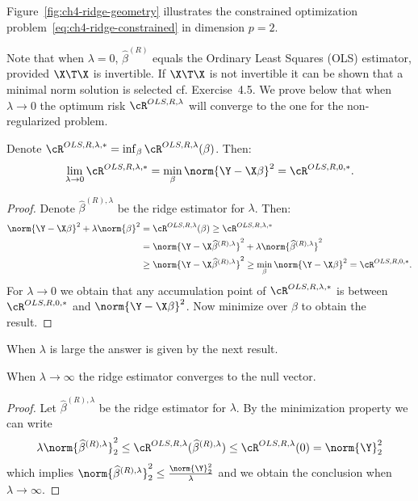 Figure~\ref{fig:ch4-ridge-geometry} illustrates the constrained optimization problem~\eqref{eq:ch4-ridge-constrained} in dimension $p = 2$.

Note that when $\lambda = 0$, $\widehat{\beta}^{(R)}$ equals the Ordinary Least Squares (OLS)
estimator, provided $\X\T \X$ is invertible. If $\X\T \X$ is not invertible it can be
shown that a minimal norm solution is selected cf. Exercise~4.5. We prove
below that when $\lambda \to 0$ the optimum risk $\cR^{OLS, R, \lambda}$ will converge to the one
for the non-regularized problem.

\begin{lemma}
Denote $\cR^{OLS, R, \lambda, *} = \inf_\beta \cR^{OLS, R, \lambda}(\beta)$. Then:
\begin{equation}\label{eq:ch4-ridge-limit-zero}
\lim_{\lambda \to 0} \cR^{OLS, R, \lambda, *} = \min_\beta \norm{\Y - \X \beta}^2 = \cR^{OLS, R, 0, *}.
\end{equation}
\end{lemma}

\begin{proof}
Denote $\widehat{\beta}^{(R), \lambda}$ be the ridge estimator for $\lambda$. Then:
\begin{align}
\norm{\Y - \X \beta}^2 + \lambda \norm{\beta}^2 &= \cR^{OLS, R, \lambda}(\beta) \ge \cR^{OLS, R, \lambda, *} \nonumber\\
&= \norm{\Y - \X \widehat{\beta}^{(R), \lambda}}^2 + \lambda \norm{\widehat{\beta}^{(R), \lambda}}^2 \nonumber\\
&\ge \norm{\Y - \X \widehat{\beta}^{(R), \lambda}}^2 \ge \min_\beta \norm{\Y - \X \beta}^2 = \cR^{OLS, R, 0, *}. \label{eq:ch4-ridge-chain}
\end{align}
For $\lambda \to 0$ we obtain that any accumulation point of $\cR^{OLS, R, \lambda, *}$ is between
$\cR^{OLS, R, 0, *}$ and $\norm{\Y - \X \beta}^2$. Now minimize over $\beta$ to obtain the result.
\end{proof}

When $\lambda$ is large the answer is given by the next result.

\begin{lemma}
When $\lambda \to \infty$ the ridge estimator converges to the null vector.
\end{lemma}

\begin{proof}
Let $\widehat{\beta}^{(R), \lambda}$ be the ridge estimator for $\lambda$. By the minimization property
we can write
\begin{equation}\label{eq:ch4-ridge-bound-infty}
\lambda \norm{\widehat{\beta}^{(R), \lambda}}_2^2 \le \cR^{OLS, R, \lambda}(\widehat{\beta}^{(R), \lambda}) \le \cR^{OLS, R, \lambda}(0) = \norm{\Y}_2^2
\end{equation}
which implies $\norm{\widehat{\beta}^{(R), \lambda}}_2^2 \le \frac{\norm{\Y}_2^2}{\lambda}$ and we obtain the conclusion when $\lambda \to \infty$.
\end{proof}

